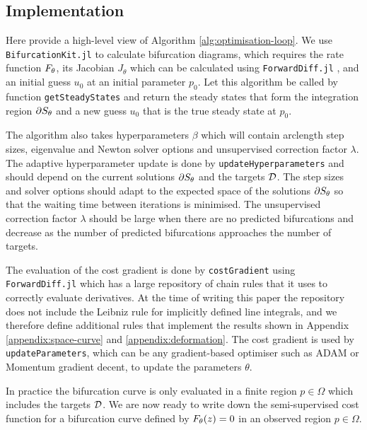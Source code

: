 \subsection{Implementation}
\label{section:implementation}
Here provide a high-level view of Algorithm \ref{alg:optimisation-loop}. We use \texttt{BifurcationKit.jl} \cite{Veltz2019PseudoArcLengthContinuation.jl} to calculate bifurcation diagrams, which requires the rate function $F_{\theta}$, its Jacobian $J_\theta$ which can be calculated using \texttt{ForwardDiff.jl} \cite{Revels2016Forward-ModeJulia}, and an initial guess $u_0$ at an initial parameter $p_0$. Let this algorithm be called by function \texttt{getSteadyStates} and return the steady states that form the integration region $\partial S_{\theta}$ and a new guess $u_0$ that is the true steady state at $p_0$.

The algorithm also takes hyperparameters $\beta$ which will contain arclength step sizes, eigenvalue and Newton solver options and unsupervised correction factor $\lambda$. The adaptive hyperparameter update is done by \texttt{updateHyperparameters} and should depend on the current solutions $\partial S_{\theta}$ and the targets $\mathcal{D}$. The step sizes and solver options should adapt to the expected space of the solutions $\partial S_{\theta}$ so that the waiting time between iterations is minimised. The unsupervised correction factor $\lambda$ should be large when there are no predicted bifurcations and decrease as the number of predicted bifurcations approaches the number of targets.

The evaluation of the cost gradient is done by \texttt{costGradient} using \texttt{ForwardDiff.jl} \cite{Revels2016Forward-ModeJulia} which has a large repository of chain rules that it uses to correctly evaluate derivatives. At the time of writing this paper the repository does not include the Leibniz rule \cite{Flanders1973DifferentiationSign} for implicitly defined line integrals, and we therefore define additional rules that implement the results shown in Appendix \ref{appendix:space-curve} and \ref{appendix:deformation}. The cost gradient is used by \texttt{updateParameters}, which can be any gradient-based optimiser such as ADAM or Momentum gradient decent, to update the parameters $\theta$.

In practice the bifurcation curve is only evaluated in a finite region $p\in\Omega$ which includes the targets $\mathcal{D}$. We are now ready to write down the semi-supervised cost function for a bifurcation curve defined by $F_{\theta}(z)=0$ in an observed region $p\in\Omega$.


